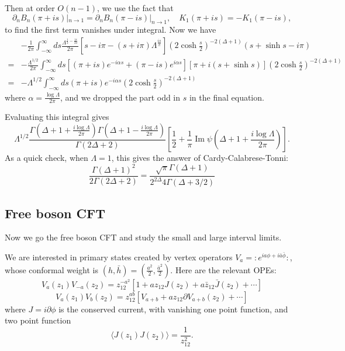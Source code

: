 \documentclass{article}
\theoremstyle{plain}
\theoremstyle{definition}
\theoremstyle{plain}
\def\la{\langle}
\def\ra{\rangle}
\begin{document}
Then at order $O(n-1)$, we use the fact that
\begin{equation}
    \partial_n B_n(\pi+is)|_{n\to 1} = \partial_n B_n(\pi-is)|_{n\to 1}, \quad K_1(\pi+is)=-K_1(\pi-is),
\end{equation}
to find the first term vanishes under integral. Now we have
\begin{equation}
\begin{aligned}
    &-\frac{1}{2\pi}\int_{-\infty}^\infty ds \frac{\Lambda^{\frac{1}{2}-\frac{i s}{2\pi}}}{2\pi}
\left[
s-i\pi-(s+i\pi)\Lambda^{\frac{i s}{\pi}}
\right]
\left(2\cosh\frac{s}{2}\right)^{-2(\Delta+1)}
\left(s+\sinh s-i\pi\right)\\
=&-\frac{\Lambda^{1 / 2}}{2 \pi} \int_{-\infty}^{\infty} d s\left[(\pi+i s) e^{-i \alpha s}+(\pi-i s) e^{i \alpha s}\right][\pi+i(s+\sinh s)] \left(2\cosh\frac{s}{2}\right)^{-2(\Delta+1)}\\
=& -\Lambda^{1 / 2} \int_{-\infty}^{\infty} d s(\pi+i s) e^{-i \alpha s} \left(2\cosh\frac{s}{2}\right)^{-2(\Delta+1)}
\end{aligned}
\end{equation}
where $\alpha= \frac{\log \Lambda}{2\pi}$, and we dropped the part odd in $s$ in the final equation.

Evaluating this integral gives
\begin{equation}
\Lambda^{1/2}
\frac{
\Gamma\!\left(\Delta+1+\frac{i\log\Lambda}{2\pi}\right)
\Gamma\!\left(\Delta+1-\frac{i\log\Lambda}{2\pi}\right)
}{
\Gamma(2\Delta+2)
}
\left[
\frac{1}{2}
+
\frac{1}{\pi}\operatorname{Im}
\psi\!\left(\Delta+1+\frac{i\log\Lambda}{2\pi}\right)
\right].
\end{equation}
As a quick check, when $\Lambda=1$, this gives the answer of Cardy-Calabrese-Tonni:
\begin{equation}
    \frac{\Gamma(\Delta+1)^2}{2\Gamma(2\Delta+2)} = \frac{\sqrt{\pi}\Gamma(\Delta+1)}{2^{2\Delta}4\Gamma(\Delta+3/2)}
\end{equation}

\subsection{Free boson CFT}
Now we go the free boson CFT and study the small and large interval limits.

We are interested in primary states created by vertex operators $V_a = : e^{ia\phi+i\bar a\bar\phi}:$, whose conformal weight is $(h,\bar h) = (\frac{a^2}{2},\frac{\bar a^2}{2})$. Here are the relevant OPEs:
\begin{equation}
    V_a(z_1) V_{-a}(z_2) = z_{12}^{-a^2}\left[ 1+a z_{12}J(z_2) + a \bar z_{12}\bar J(z_2)+\cdots \right]
\end{equation}
\begin{equation}
    V_a (z_1)V_b(z_2) = z_{12}^{ab} \left[ V_{a+b}+ a z_{12} \partial V_{a+b}(z_2) +\cdots  \right]
\end{equation}
where $J=i\partial \phi$ is the conserved current, with vanishing one point function, and two point function
\begin{equation}
    \la J(z_1) J(z_2) \ra = \frac{1}{z_{12}^2}.
\end{equation}
\end{document}
